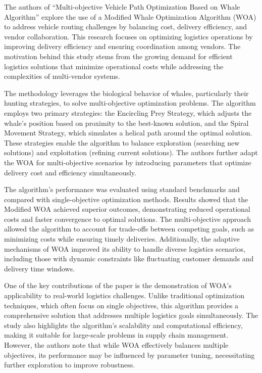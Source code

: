 The authors of “Multi-objective Vehicle Path Optimization Based on Whale Algorithm” explore the use of a Modified Whale Optimization Algorithm (WOA) to address vehicle routing challenges by balancing cost, delivery efficiency, and vendor collaboration. This research focuses on optimizing logistics operations by improving delivery efficiency and ensuring coordination among vendors. The motivation behind this study stems from the growing demand for efficient logistics solutions that minimize operational costs while addressing the complexities of multi-vendor systems.

The methodology leverages the biological behavior of whales, particularly their hunting strategies, to solve multi-objective optimization problems. The algorithm employs two primary strategies: the Encircling Prey Strategy, which adjusts the whale’s position based on proximity to the best-known solution, and the Spiral Movement Strategy, which simulates a helical path around the optimal solution. These strategies enable the algorithm to balance exploration (searching new solutions) and exploitation (refining current solutions). The authors further adapt the WOA for multi-objective scenarios by introducing parameters that optimize delivery cost and efficiency simultaneously.

The algorithm's performance was evaluated using standard benchmarks and compared with single-objective optimization methods. Results showed that the Modified WOA achieved superior outcomes, demonstrating reduced operational costs and faster convergence to optimal solutions. The multi-objective approach allowed the algorithm to account for trade-offs between competing goals, such as minimizing costs while ensuring timely deliveries. Additionally, the adaptive mechanisms of WOA improved its ability to handle diverse logistics scenarios, including those with dynamic constraints like fluctuating customer demands and delivery time windows.

One of the key contributions of the paper is the demonstration of WOA’s applicability to real-world logistics challenges. Unlike traditional optimization techniques, which often focus on single objectives, this algorithm provides a comprehensive solution that addresses multiple logistics goals simultaneously. The study also highlights the algorithm’s scalability and computational efficiency, making it suitable for large-scale problems in supply chain management. However, the authors note that while WOA effectively balances multiple objectives, its performance may be influenced by parameter tuning, necessitating further exploration to improve robustness.

